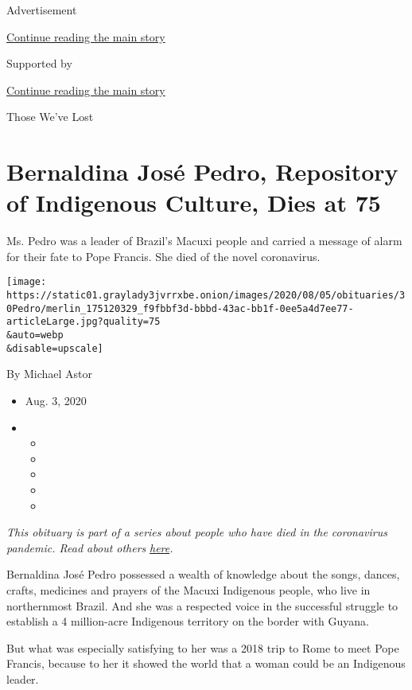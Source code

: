 Advertisement

\protect\hyperlink{after-top}{Continue reading the main story}

Supported by

\protect\hyperlink{after-sponsor}{Continue reading the main story}

Those We've Lost

\hypertarget{bernaldina-josuxe9-pedro-repository-of-indigenous-culture-dies-at-75}{%
\section{Bernaldina José Pedro, Repository of Indigenous Culture, Dies
at
75}\label{bernaldina-josuxe9-pedro-repository-of-indigenous-culture-dies-at-75}}

Ms. Pedro was a leader of Brazil's Macuxi people and carried a message
of alarm for their fate to Pope Francis. She died of the novel
coronavirus.

\texttt{[image: https://static01.graylady3jvrrxbe.onion/images/2020/08/05/obituaries/30Pedro/merlin\_175120329\_f9fbbf3d-bbbd-43ac-bb1f-0ee5a4d7ee77-articleLarge.jpg?quality=75\\\&auto=webp\\\&disable=upscale]}

By Michael Astor

\begin{itemize}
\item
  Aug. 3, 2020
\item
  \begin{itemize}
  \item
  \item
  \item
  \item
  \item
  \end{itemize}
\end{itemize}

\emph{This obituary is part of a series about people who have died in
the coronavirus pandemic. Read about others}
\href{https://www.nytimes3xbfgragh.onion/interactive/2020/obituaries/people-died-coronavirus-obituaries.html}{\emph{here}}\emph{.}

Bernaldina José Pedro possessed a wealth of knowledge about the songs,
dances, crafts, medicines and prayers of the Macuxi Indigenous people,
who live in northernmost Brazil. And she was a respected voice in the
successful struggle to establish a 4 million-acre Indigenous territory
on the border with Guyana.

But what was especially satisfying to her was a 2018 trip to Rome to
meet Pope Francis, because to her it showed the world that a woman could
be an Indigenous leader.

